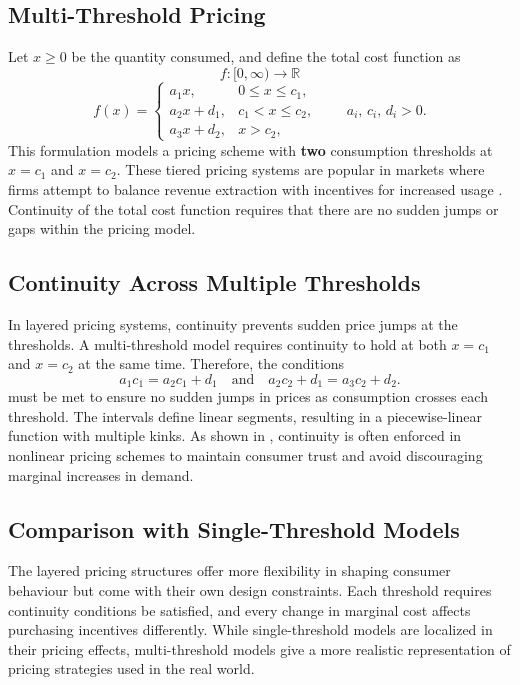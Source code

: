 \documentclass{article}
\begin{document}
\subsection{Multi-Threshold Pricing}
Let $x \ge 0$ be the quantity consumed, and define the total cost function as
\[
f \colon [0,\infty) \to \mathbb{R}
\]
\[
f(x) =
\begin{cases}
a_1 x, & 0 \le x \le c_1, \\
a_2 x + d_1, & c_1 < x \le c_2, \\
a_3 x + d_2, & x > c_2,
\end{cases}
\qquad a_i,\, c_i,\, d_i > 0.
\]
This formulation models a pricing scheme with \textbf{two} consumption thresholds at
\( x = c_1 \) and \( x = c_2 \). These tiered pricing systems are popular in markets where firms attempt to balance revenue extraction with incentives for increased usage \textcite{radic2024}. Continuity of the total cost function requires that there are no sudden jumps or gaps within the pricing model. 

\subsection{Continuity Across Multiple Thresholds}
In layered pricing systems, continuity prevents sudden price jumps at the thresholds. A multi-threshold model requires continuity to hold at both \( x = c_1 \) and \( x = c_2 \) at the same time. Therefore, the conditions
\[
a_1 c_1 = a_2 c_1 + d_1
\quad \text{and} \quad
a_2 c_2 + d_1 = a_3 c_2 + d_2.
\]
must be met to ensure no sudden jumps in prices as consumption crosses each threshold. The intervals define linear segments, resulting in a piecewise-linear function with multiple kinks. As shown in \textcite{K2017}, continuity is often enforced in nonlinear pricing schemes to maintain consumer trust and avoid discouraging marginal increases in demand.

\subsection{Comparison with Single-Threshold Models}
The layered pricing structures offer more flexibility in shaping consumer behaviour but come with their own design constraints. Each threshold requires continuity conditions be satisfied, and every change in marginal cost affects purchasing incentives differently. While single-threshold models are localized in their pricing effects, multi-threshold models give a more realistic representation of pricing strategies used in the real world. 
\end{document}
